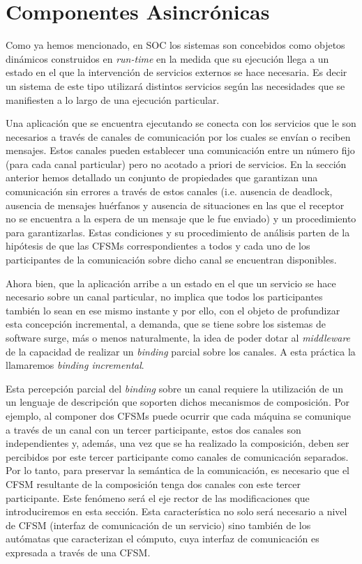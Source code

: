 

\section{Componentes Asincrónicas}
Como ya hemos mencionado, en SOC los sistemas son concebidos como objetos dinámicos construidos en \emph{run-time} en la medida que su ejecución llega a un estado en el que la intervención de servicios externos se hace necesaria. Es decir un sistema de este tipo utilizará distintos servicios según las necesidades que se manifiesten a lo largo de una ejecución particular. 
 
Una aplicación que se encuentra ejecutando se conecta con los servicios que le son necesarios a través de canales de comunicación por los cuales se envían o reciben mensajes. Estos canales pueden establecer una comunicación entre un número fijo (para cada canal particular) pero no acotado a priori de servicios. En la sección anterior hemos detallado un conjunto de propiedades que garantizan una comunicación sin errores a través de estos canales (i.e. ausencia de deadlock, ausencia de mensajes huérfanos y ausencia de situaciones en las que el receptor no se encuentra a la espera de un mensaje que le fue enviado) y un procedimiento para garantizarlas. Estas condiciones y su procedimiento de análisis parten de la hipótesis de que las CFSMs correspondientes a todos y cada uno de los participantes de la comunicación sobre dicho canal se encuentran disponibles.

Ahora bien, que la aplicación arribe a un estado en el que un servicio se hace necesario sobre un canal particular, no implica que todos los participantes también lo sean en ese mismo instante y por ello, con el objeto de profundizar esta concepción incremental, a demanda, que se tiene sobre los sistemas de software surge, más o menos naturalmente, la idea de poder dotar al \emph{middleware} de la capacidad de realizar un \emph{binding} parcial sobre los canales. A esta práctica la llamaremos \emph{binding incremental}.
 
Esta percepción parcial del \emph{binding} sobre un canal requiere la utilización de un un lenguaje de descripción que soporten dichos mecanismos de composición. Por ejemplo, al componer dos CFSMs puede ocurrir que cada máquina se comunique a través de un canal con un tercer participante, estos dos canales son independientes y, además, una vez que se ha realizado la composición, deben ser percibidos por este tercer participante como canales de comunicación separados. Por lo tanto, para preservar la semántica de la comunicación, es necesario que el CFSM resultante de la composición tenga dos canales con este tercer participante. Este fenómeno será el eje rector de las modificaciones que introduciremos en esta sección. Esta característica no solo será necesario a nivel de CFSM (interfaz de comunicación de un servicio) sino también de los autómatas que caracterizan el cómputo, cuya interfaz de comunicación es expresada a través de una CFSM.

